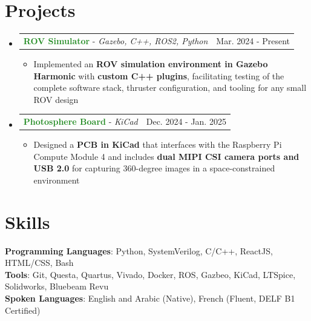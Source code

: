 \documentclass[letterpaper,11pt]{article}
\makeatletter
\newcommand{\resumeItem}[1]{
  \item\small{
    {#1 \vspace{-2pt}}
  }
}
\newcommand{\resumeProjectHeading}[2]{
    \item
    \begin{tabular*}{0.97\textwidth}{l@{\extracolsep{\fill}}r}
      \small#1 & #2 \\
    \end{tabular*}\vspace{-7pt}
}
\newcommand{\resumeSubHeadingListStart}{\begin{itemize}[leftmargin=0.15in, label={}]}
\newcommand{\resumeSubHeadingListEnd}{\end{itemize}}
\newcommand{\resumeItemListStart}{\begin{itemize}}
\newcommand{\resumeItemListEnd}{\end{itemize}\vspace{-5pt}}
\makeatother
\begin{document}
\section{Projects}
    \resumeSubHeadingListStart
      \resumeProjectHeading
          {\textbf{\textcolor{ForestGreen}{ROV Simulator}} - \emph{Gazebo, C++, ROS2, Python}}{Mar. 2024 - Present}
          \resumeItemListStart
            \resumeItem{Implemented an \textbf{ROV simulation environment in Gazebo Harmonic} with \textbf{custom 
                        C++ plugins}, facilitating testing of the complete software stack, thruster configuration, and tooling for any small ROV design}
          \resumeItemListEnd
      \resumeProjectHeading
      {\textbf{\textcolor{ForestGreen}{Photosphere Board}} - \emph{KiCad}}{Dec. 2024 - Jan. 2025}
      \resumeItemListStart
        \resumeItem{Designed a \textbf{PCB in KiCad} that interfaces with the Raspberry Pi Compute Module 4 and includes 
                    \textbf{dual MIPI CSI camera ports and USB 2.0} for capturing 360-degree images in a space-constrained environment}
      \resumeItemListEnd
    \resumeSubHeadingListEnd



%
\section{Skills}
 \begin{itemize}[leftmargin=0.15in, label={}]
    \small{\item{
     \textbf{Programming Languages}{: Python, SystemVerilog, C/C++, ReactJS, HTML/CSS, Bash} \\
     \textbf{Tools}{: Git, Questa, Quartus, Vivado, Docker, ROS, Gazbeo, KiCad, LTSpice, Solidworks, Bluebeam Revu} \\
     \textbf{Spoken Languages}{: English and Arabic (Native), French (Fluent, DELF B1 Certified)}
    }}
 \end{itemize}


\end{document}
